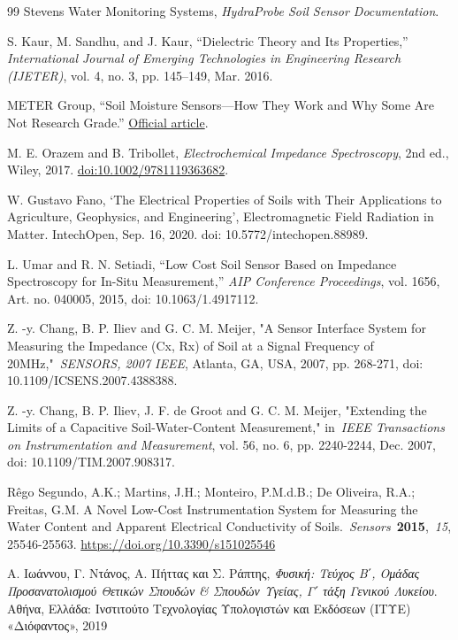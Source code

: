 \begin{thebibliography}{99}
Stevens Water Monitoring Systems, \emph{HydraProbe Soil Sensor
Documentation}.

S. Kaur, M. Sandhu, and J. Kaur, ``Dielectric Theory and Its
Properties,'' \emph{International Journal of Emerging Technologies in
Engineering Research (IJETER)}, vol. 4, no. 3, pp. 145--149, Mar. 2016.

METER Group, ``Soil Moisture Sensors---How They Work and Why
Some Are Not Research Grade.''
\href{https://metergroup.com/measurement-insights/soil-moisture-sensors-how-they-work-why-some-are-not-research-grade/}{Official
article}.

M. E. Orazem and B. Tribollet, \emph{Electrochemical Impedance
Spectroscopy}, 2nd ed., Wiley, 2017.
\href{https://doi.org/10.1002/9781119363682}{doi:10.1002/9781119363682}.

W. Gustavo Fano, `The Electrical Properties of Soils with Their
Applications to Agriculture, Geophysics, and Engineering',
Electromagnetic Field Radiation in Matter. IntechOpen, Sep. 16, 2020.
doi: 10.5772/intechopen.88989.

L. Umar and R. N. Setiadi, ``Low Cost Soil Sensor Based on
Impedance Spectroscopy for In-Situ Measurement,'' \emph{AIP Conference
Proceedings}, vol. 1656, Art. no. 040005, 2015, doi: 10.1063/1.4917112.

Z. -y. Chang, B. P. Iliev and G. C. M. Meijer, "A Sensor
Interface System for Measuring the Impedance (Cx, Rx) of Soil at a
Signal Frequency of 20MHz,"~\emph{SENSORS, 2007 IEEE}, Atlanta, GA, USA,
2007, pp. 268-271, doi: 10.1109/ICSENS.2007.4388388.

Z. -y. Chang, B. P. Iliev, J. F. de Groot and G. C. M. Meijer,
"Extending the Limits of a Capacitive Soil-Water-Content Measurement,"
in~\emph{IEEE Transactions on Instrumentation and Measurement}, vol. 56,
no. 6, pp. 2240-2244, Dec. 2007, doi: 10.1109/TIM.2007.908317.

Rêgo Segundo, A.K.; Martins, J.H.; Monteiro, P.M.d.B.; De
Oliveira, R.A.; Freitas, G.M. A Novel Low-Cost Instrumentation System
for Measuring the Water Content and Apparent Electrical Conductivity of
Soils.~\emph{Sensors}~\textbf{2015},~\emph{15}, 25546-25563.
\url{https://doi.org/10.3390/s151025546}

Α. Ιωάννου, Γ. Ντάνος, Α. Πήττας και Σ. Ράπτης, \emph{Φυσική:
Τεύχος Β΄, Ομάδας Προσανατολισμού Θετικών Σπουδών \& Σπουδών Υγείας, Γ΄
τάξη Γενικού Λυκείου}. Αθήνα, Ελλάδα: Ινστιτούτο Τεχνολογίας Υπολογιστών
και Εκδόσεων (ΙΤΥΕ) «Διόφαντος», 2019



\end{thebibliography}
